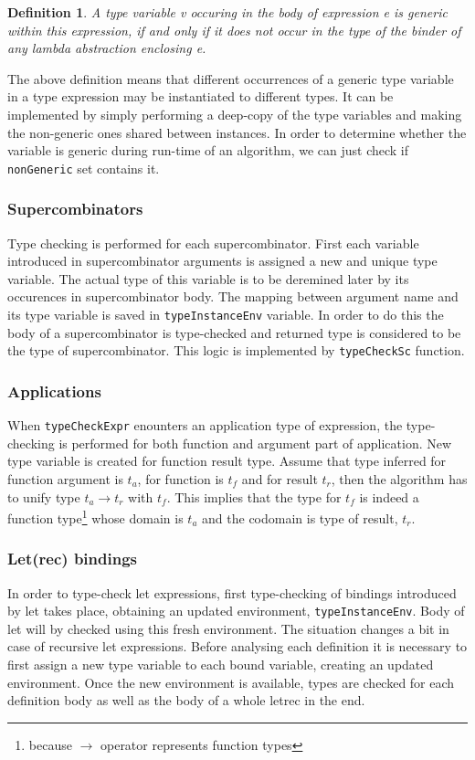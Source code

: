 \documentclass[12pt,a4paper]{report}
\newtheorem{definition}{Definition}[chapter]
\begin{document}
\begin{definition}
  A type variable v occuring in the body of expression e is generic within this
  expression, if and only if it does not occur in the type of the binder of any
  lambda abstraction enclosing e.
\end{definition}

The above definition means that different occurrences of a generic type
variable in a type expression may be instantiated to different types. It can be
implemented by simply performing a deep-copy of the type variables and making
the non-generic ones shared between instances. In order to determine whether
the variable is generic during run-time of an algorithm, we can just check if
\texttt{nonGeneric} set contains it.

\subsubsection{Supercombinators}
Type checking is performed for each supercombinator. First each variable
introduced in supercombinator arguments is assigned a new and unique type
variable. The actual type of this variable is to be deremined later by its
occurences in supercombinator body. The mapping between argument name and its
type variable is saved in \texttt{typeInstanceEnv} variable. In order to do
this the body of a supercombinator is type-checked and returned type is
considered to be the type of supercombinator. This logic is implemented by
\texttt{typeCheckSc} function.

\subsubsection{Applications}
When \texttt{typeCheckExpr} enounters an application type of expression, the
type-checking is performed for both function and argument part of application.
New type variable is created for function result type. Assume that type
inferred for function argument is $t_a$, for function is $t_f$ and for result
$t_r$, then the algorithm has to unify type $t_a \rightarrow
t_r$ with $t_f$. This implies that the type for $t_f$ is indeed a function
type\footnote{because $\rightarrow$ operator represents function types} whose
domain is $t_a$ and the codomain is type of result, $t_r$.

\subsubsection{Let(rec) bindings}
In order to type-check let expressions, first type-checking of
bindings introduced by let takes place, obtaining an updated
environment, \texttt{typeInstanceEnv}. Body of let will by checked
using this fresh environment. The situation changes a bit in case of recursive
let expressions. Before analysing each definition it is necessary to
first assign a new type variable to each bound variable, creating an updated
environment. Once the new environment is available, types are checked for each
definition body as well as the body of a whole letrec in the end.
\end{document}
